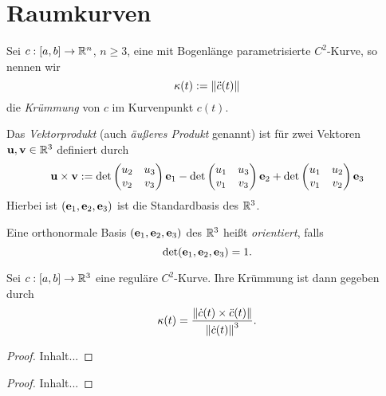 \documentclass[
pdftex,
oneside,
headsepline,
11pt, 
]{scrreprt}
\begin{document}
\section{Raumkurven}
\begin{de}[Krümmung]
	Sei $c:[a,b]\to\mathbb{R}^n$, $n\geq 3$, eine mit Bogenlänge parametrisierte $C^2$-Kurve, so nennen wir 
	\[ \kappa(t):=\left\lVert\ddot{c}(t)\right\rVert \] die \textit{Krümmung} von $c$ im Kurvenpunkt $c(t)$.
\end{de}
\begin{de}[Vektorprodukt]
	Das \textit{Vektorprodukt} (auch \textit{äußeres Produkt} genannt) ist für zwei Vektoren $\textnormal{\textbf{u}},\textnormal{\textbf{v}}\in \mathbb{R}^3$ definiert durch \[  \textnormal{\textbf{u}}\times \textnormal{\textbf{v}}:=\det \begin{pmatrix}
	u_2 & u_3\\
	v_2 & v_3\\
	\end{pmatrix}\textnormal{\textbf{e}}_1-\det\begin{pmatrix}
	u_1 & u_3\\
	v_1 & v_3
	\end{pmatrix} \textnormal{\textbf{e}}_2 +\det \begin{pmatrix}
	u_1 & u_2 \\
	v_1 & v_2
	\end{pmatrix} \textnormal{\textbf{e}}_3 \]
	Hierbei ist $(\textnormal{\textbf{e}}_1,\textnormal{\textbf{e}}_2,\textnormal{\textbf{e}}_3)$ ist die Standardbasis des $\mathbb{R}^3$.
\end{de}
\begin{de}
	Eine orthonormale Basis $(\textnormal{\textbf{e}}_1,\textnormal{\textbf{e}}_2,\textnormal{\textbf{e}}_3)$ des $\mathbb{R}^3$ heißt \textit{orientiert}, falls \[ \det(\textnormal{\textbf{e}}_1,\textnormal{\textbf{e}}_2,\textnormal{\textbf{e}}_3)=1. \]
\end{de}
\begin{lem}
	Sei $c:[a,b]\to \mathbb{R}^3$ eine reguläre $C^2$-Kurve. Ihre Krümmung ist dann gegeben durch \[ \kappa(t)=\frac{\left\lVert\dot{c}(t)\times \ddot{c}(t)\right\rVert}{\left\lVert\dot{c}(t)\right\rVert^3}. \]
\end{lem}
\begin{proof}
	Inhalt...
\end{proof}
\begin{de}

\end{de}
\begin{lem}
	
\end{lem}
\begin{proof}
	Inhalt...
\end{proof}
\begin{de}
	
\end{de}
\end{document}
